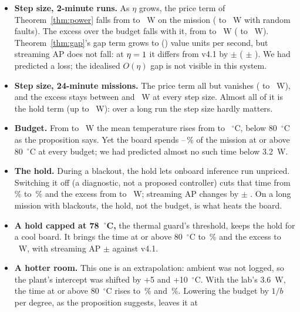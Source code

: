 \documentclass[conference]{IEEEtran}
\begin{document}
\begin{itemize}
\item \textbf{Step size, 2-minute runs.} As $\eta$ grows, the price term of Theorem~\ref{thm:power} falls from
\TsMisPriceLo{} to \TsMisPriceHi~W on the mission (\TsRndPriceLo{} to \TsRndPriceHi~W with random faults). The excess
over the budget falls with it, from \TsMisExcLo{} to \TsMisExcHi~W (\TsRndExcLo{} to \TsRndExcHi~W). Theorem~\ref{thm:gap}'s
gap term grows to \TsMisGapHi{} (\TsRndGapHi) value units per second, but streaming AP does not fall: at
$\eta = 1$ it differs from v4.1 by \TsMisSapHi{} $\pm$ \TsMisSapHiCi{} (\TsRndSapHi{} $\pm$ \TsRndSapHiCi). We
had predicted a loss; the idealised $O(\eta)$ gap is not visible in this system.
\item \textbf{Step size, 24-minute missions.} The price term all but vanishes (\TsLongPriceLo{} to \TsLongPriceHi~W),
and the excess stays between \TsLongExcHi{} and \TsLongExcLo~W at every step size. Almost all of it is the hold term
(up to \TsLongHoldMax~W): over a long run the step size hardly matters.
\item \textbf{Budget.} From \TsBudMin{} to \TsBudMax~W the mean temperature rises from \TsTempLo{} to \TsTempHi~$^\circ$C,
below 80~$^\circ$C as the proposition says. Yet the board spends \TsHotMin--\TsHotMax\,\% of the mission at or above
80~$^\circ$C at every budget; we had predicted almost no such time below 3.2~W.
\item \textbf{The hold.} During a blackout, the hold lets onboard inference run unpriced. Switching it off (a
diagnostic, not a proposed controller) cuts that time from \TsVHot\,\% to \TsNoHoldHot\,\% and the excess from
\TsVExc{} to \TsNoHoldExc~W; streaming AP changes by \TsNoHoldSap{} $\pm$ \TsNoHoldSapCi. On a long mission with
blackouts, the hold, not the budget, is what heats the board.
\item \textbf{A hold capped at 78~$^\circ$C,} the thermal guard's threshold, keeps the hold for a cool board. It brings
the time at or above 80~$^\circ$C to \TsHoldSeventyEightHot\,\% and the excess to \TsHoldSeventyEightExc~W, with
streaming AP \TsHoldSeventyEightSap{} $\pm$ \TsHoldSeventyEightSapCi{} against v4.1.
\item \textbf{A hotter room.} This one is an extrapolation: ambient was not logged, so the plant's intercept was shifted
by +5 and +10~$^\circ$C. With the lab's 3.6~W, the time at or above 80~$^\circ$C rises to \TsAmbFiveKeptHot\,\% and
\TsAmbTenKeptHot\,\%. Lowering the budget by $1/b$ per degree, as the proposition suggests, leaves it at

\end{itemize}
\end{document}
